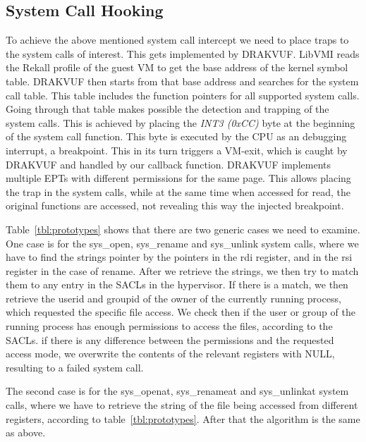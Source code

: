 \subsection{System Call Hooking}\label{sub:hooking}

To achieve the above mentioned system call intercept we need to place traps to the system calls of interest. This gets implemented by DRAKVUF. LibVMI reads the Rekall profile of the guest \ac{VM} to get the base address of the kernel symbol table. DRAKVUF then starts from that base address and searches for the system call table. This table includes the function pointers for all supported system calls. Going through that table makes possible the detection and trapping of the system calls. This is achieved by placing the \textit{INT3 (0xCC)} byte at the beginning of the system call function. This byte is executed by the \ac{CPU} as an debugging interrupt, a breakpoint. This in its turn triggers a VM-exit, which is caught by DRAKVUF and handled by our callback function. DRAKVUF implements multiple \ac{EPT}s with different permissions for the same page. This allows placing the trap in the system calls, while at the same time when accessed for read, the original functions are accessed, not revealing this way the injected breakpoint.

\par Table~\ref{tbl:prototypes} shows that there are two generic cases we need to examine. One case is for the sys\_open, sys\_rename and sys\_unlink system calls, where we have to find the strings pointer by the pointers in the rdi register, and in the rsi register in the case of rename. After we retrieve the strings, we then try to match them to any entry in the \ac{SACL}s in the hypervisor. If there is a match, we then retrieve the userid and groupid of the owner of the currently running process, which requested the specific file access. We check then if the user or group of the running process has enough permissions to access the files, according to the \ac{SACL}s. if there is any difference between the permissions and the requested access mode, we overwrite the contents of the relevant registers with NULL, resulting to a failed system call.

\par The second case is for the sys\_openat, sys\_renameat and sys\_unlinkat system calls, where we have to retrieve the string of the file being accessed from different registers, according to table~\ref{tbl:prototypes}. After that the algorithm is the same as above.


